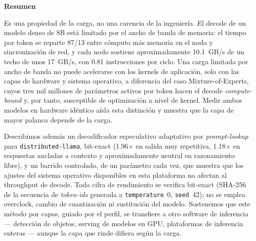 \documentclass[10pt,a4paper]{article}
\renewenvironment{abstract}{%
  \vspace{2pt}\begin{center}\textbf{Resumen}\end{center}\par\vspace{1pt}%
  \begingroup\small\setlength{\leftskip}{1.8em}\setlength{\rightskip}{1.8em}\noindent\ignorespaces
}{\par\endgroup\vspace{10pt}}
\begin{document}
\begin{abstract}
Es una propiedad de la carga, no una carencia de la ingeniería. El decode de un modelo denso de 8B está limitado por el ancho de banda de memoria: el tiempo por token se reparte 87/13 entre cómputo más memoria en el nodo y sincronización de red, y cada nodo sostiene aproximadamente 10.1~GB/s de un techo de unos 17~GB/s, con 0.81 instrucciones por ciclo. Una carga limitada por ancho de banda no puede acelerarse con los kernels de aplicación, solo con las capas de hardware y sistema operativo, a diferencia del caso Mixture-of-Experts, cuyos tres mil millones de parámetros activos por token hacen el decode \emph{compute-bound} y, por tanto, susceptible de optimización a nivel de kernel. Medir ambos modelos en hardware idéntico aísla esta distinción y muestra que la capa de mayor palanca depende de la carga.

Describimos además un decodificador especulativo adaptativo por \emph{prompt-lookup} para \texttt{distributed-llama}, bit-exact (1.96$\times$ en salida muy repetitiva, 1.18$\times$ en respuestas ancladas a contexto y aproximadamente neutral en razonamiento libre), y un barrido controlado, de un parámetro cada vez, que muestra que los ajustes del sistema operativo disponibles en esta plataforma no afectan al throughput de decode. Toda cifra de rendimiento se verifica bit-exact (SHA-256 de la secuencia de \emph{token-ids} generada a \texttt{temperature}~0, \texttt{seed}~42); no se emplea overclock, cambio de cuantización ni sustitución del modelo. Sostenemos que este método por capas, guiado por el perfil, se transfiere a otro software de inferencia --- detección de objetos, serving de modelos en GPU, plataformas de inferencia enteras --- aunque la capa que rinde difiera según la carga.
\end{abstract}
\end{document}
